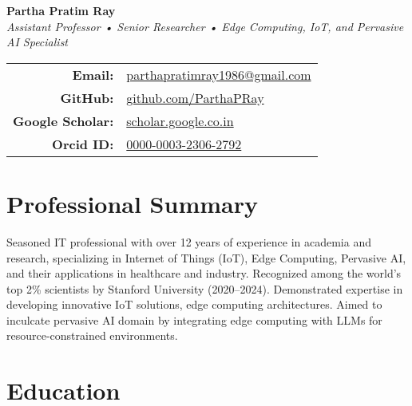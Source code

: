 \documentclass[10pt,a4paper]{article}
\begin{document}
	
	\begin{center}
		{\LARGE \textbf{Partha Pratim Ray}}\\
		\vspace{1mm}
		\textit{Assistant Professor • Senior Researcher • Edge Computing, IoT, and Pervasive AI Specialist}\\
		\vspace{1mm}
		\begin{tabular}{rl}
			\textbf{Email:} & \href{mailto:parthapratimray1986@gmail.com}{parthapratimray1986@gmail.com} \\
			\textbf{GitHub:} & \href{https://github.com/ParthaPRay}{github.com/ParthaPRay} \\
			\textbf{Google Scholar:} & \href{https://scholar.google.co.in/citations?user=ioplfagAAAAJ&hl=en&oi=ao}{scholar.google.co.in} \\
			\textbf{Orcid ID:} & \href{http://orcid.org/0000-0003-2306-2792}{0000-0003-2306-2792} \\
		\end{tabular}
	\end{center}
	
	\section*{Professional Summary}
	
	Seasoned IT professional with over 12 years of experience in academia and research, specializing in Internet of Things (IoT), Edge Computing, Pervasive AI, and their applications in healthcare and industry. Recognized among the world's top 2\% scientists by Stanford University (2020--2024). Demonstrated expertise in developing innovative IoT solutions, edge computing architectures. Aimed to inculcate pervasive AI domain by integrating edge computing with LLMs for resource-constrained environments.
	
	\section*{Education}
	
\end{document}
